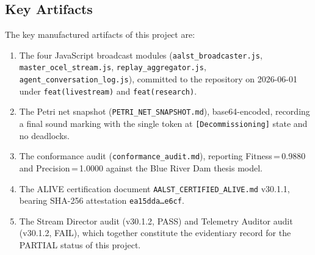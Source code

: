 \subsection{Key Artifacts}
\label{sec:livestream-identity-artifacts}

The key manufactured artifacts of this project are:
\begin{enumerate}
  \item The four JavaScript broadcast modules (\texttt{aalst\_broadcaster.js},
    \texttt{master\_ocel\_stream.js}, \texttt{replay\_aggregator.js},
    \texttt{agent\_conversation\_log.js}), committed to the repository on 2026-06-01
    under \texttt{feat(livestream)} and \texttt{feat(research)}.
  \item The Petri net snapshot (\texttt{PETRI\_NET\_SNAPSHOT.md}), base64-encoded,
    recording a final sound marking with the single token at \texttt{[Decommissioning]}
    state and no deadlocks.
  \item The conformance audit (\texttt{conformance\_audit.md}), reporting
    Fitness\,=\,0.9880 and Precision\,=\,1.0000 against the Blue River Dam thesis model.
  \item The ALIVE certification document \texttt{AALST\_CERTIFIED\_ALIVE.md} v30.1.1,
    bearing SHA-256 attestation \texttt{ea15dda\ldots{}e6cf}.
  \item The Stream Director audit (v30.1.2, PASS) and Telemetry Auditor audit
    (v30.1.2, FAIL), which together constitute the evidentiary record for the
    PARTIAL status of this project.
\end{enumerate}
